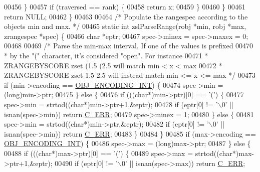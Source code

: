 \begin{DoxyCode}
00456         \}
00457         \textcolor{keywordflow}{if} (traversed == rank) \{
00458             \textcolor{keywordflow}{return} x;
00459         \}
00460     \}
00461     \textcolor{keywordflow}{return} NULL;
00462 \}
00463 
00464 \textcolor{comment}{/* Populate the rangespec according to the objects min and max. */}
00465 \textcolor{keyword}{static} \textcolor{keywordtype}{int} zslParseRange(robj *min, robj *max, zrangespec *spec) \{
00466     \textcolor{keywordtype}{char} *eptr;
00467     spec->minex = spec->maxex = 0;
00468 
00469     \textcolor{comment}{/* Parse the min-max interval. If one of the values is prefixed}
00470 \textcolor{comment}{     * by the "(" character, it's considered "open". For instance}
00471 \textcolor{comment}{     * ZRANGEBYSCORE zset (1.5 (2.5 will match min < x < max}
00472 \textcolor{comment}{     * ZRANGEBYSCORE zset 1.5 2.5 will instead match min <= x <= max */}
00473     \textcolor{keywordflow}{if} (min->encoding == \hyperlink{server_8h_ae934cf008a0be0ef009c92c2d006a816}{OBJ\_ENCODING\_INT}) \{
00474         spec->min = (\textcolor{keywordtype}{long})min->ptr;
00475     \} \textcolor{keywordflow}{else} \{
00476         \textcolor{keywordflow}{if} (((\textcolor{keywordtype}{char}*)min->ptr)[0] == \textcolor{stringliteral}{'('}) \{
00477             spec->min = strtod((\textcolor{keywordtype}{char}*)min->ptr+1,&eptr);
00478             \textcolor{keywordflow}{if} (eptr[0] != \textcolor{stringliteral}{'\(\backslash\)0'} || isnan(spec->min)) \textcolor{keywordflow}{return} \hyperlink{server_8h_af98ac28d5f4d23d7ed5985188e6fb7d1}{C\_ERR};
00479             spec->minex = 1;
00480         \} \textcolor{keywordflow}{else} \{
00481             spec->min = strtod((\textcolor{keywordtype}{char}*)min->ptr,&eptr);
00482             \textcolor{keywordflow}{if} (eptr[0] != \textcolor{stringliteral}{'\(\backslash\)0'} || isnan(spec->min)) \textcolor{keywordflow}{return} \hyperlink{server_8h_af98ac28d5f4d23d7ed5985188e6fb7d1}{C\_ERR};
00483         \}
00484     \}
00485     \textcolor{keywordflow}{if} (max->encoding == \hyperlink{server_8h_ae934cf008a0be0ef009c92c2d006a816}{OBJ\_ENCODING\_INT}) \{
00486         spec->max = (\textcolor{keywordtype}{long})max->ptr;
00487     \} \textcolor{keywordflow}{else} \{
00488         \textcolor{keywordflow}{if} (((\textcolor{keywordtype}{char}*)max->ptr)[0] == \textcolor{stringliteral}{'('}) \{
00489             spec->max = strtod((\textcolor{keywordtype}{char}*)max->ptr+1,&eptr);
00490             \textcolor{keywordflow}{if} (eptr[0] != \textcolor{stringliteral}{'\(\backslash\)0'} || isnan(spec->max)) \textcolor{keywordflow}{return} \hyperlink{server_8h_af98ac28d5f4d23d7ed5985188e6fb7d1}{C\_ERR};

\end{DoxyCode}
